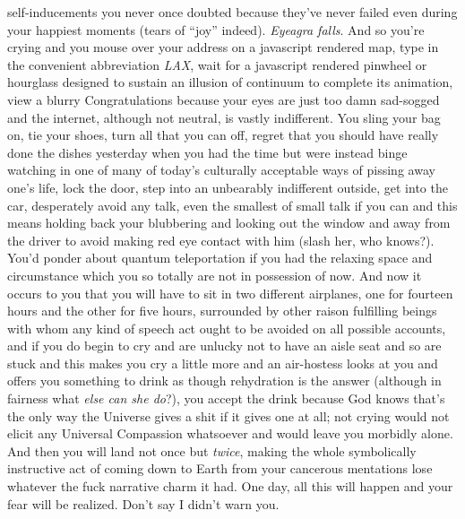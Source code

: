 \documentclass{article}
\begin{document}
self-inducements you never once doubted because they've never failed
even during your happiest moments (tears of ``joy'' indeed).
\textit{Eyeagra falls}. And so you're crying and you mouse over your
address on a javascript rendered map, type in the convenient
abbreviation \textit{LAX}, wait for a javascript rendered pinwheel or
hourglass designed to sustain an illusion of continuum to complete its
animation, view a blurry Congratulations because your eyes are just too
damn sad-sogged and the internet, although not neutral, is vastly
indifferent. You sling your bag on, tie your shoes, turn all that you
can off, regret that you should have really done the dishes yesterday
when you had the time but were instead binge watching in one of many of
today's culturally acceptable ways of pissing away one's life, lock the
door, step into an unbearably indifferent outside, get into the car,
desperately avoid any talk, even the smallest of small talk if you can
and this means holding back your blubbering and looking out the window
and away from the driver to avoid making red eye contact with him (slash
her, who knows?). You'd ponder about quantum teleportation if you had
the relaxing space and circumstance which you so totally are not in
possession of now. And now it occurs to you that you will have to sit in
two different airplanes, one for fourteen hours and the other for five
hours, surrounded by other raison fulfilling beings with whom any kind
of speech act ought to be avoided on all possible accounts, and if you
do begin to cry and are unlucky not to have an aisle seat and so are
stuck and this makes you cry a little more and an air-hostess looks at
you and offers you something to drink as though rehydration is the
answer (although in fairness what \textit{else can she do}?), you accept
the drink because God knows that's the only way the Universe gives
a shit if it gives one at all; not crying would not elicit any Universal
Compassion whatsoever and would leave you morbidly alone. And then you
will land not once but \textit{twice}, making the whole symbolically
instructive act of coming down to Earth from your cancerous mentations
lose whatever the fuck narrative charm it had. One day, all this will
happen and your fear will be realized. Don't say I didn't warn you.
\end{document}
